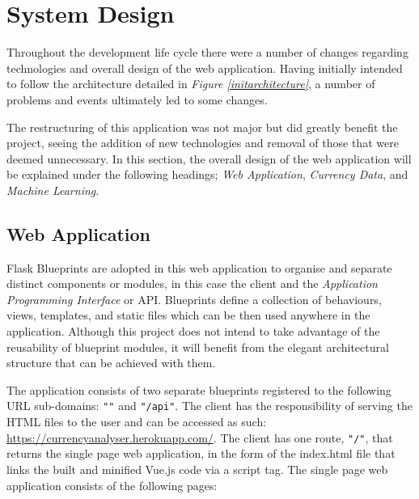 \section{System Design}\label{secdesign}

Throughout the development life cycle there were a number of changes regarding technologies and overall design of the web application. Having initially intended to follow the architecture detailed in \textit{Figure \ref{initarchitecture}}, a number of problems and events ultimately led to some changes.

The restructuring of this application was not major but did greatly benefit the project, seeing the addition of new technologies and removal of those that were deemed unnecessary. In this section, the overall design of the web application will be explained under the following headings; \textit{Web Application}, \textit{Currency Data}, and \textit{Machine Learning}.

\subsection{Web Application}

Flask Blueprints \cite{flaskblueprints} are adopted in this web application to organise and separate distinct components or modules, in this case the client and the \textit{Application Programming Interface} or API. Blueprints define a collection of behaviours, views, templates, and static files which can be then used anywhere in the application. Although this project does not intend to take advantage of the reusability of blueprint modules, it will benefit from the elegant architectural structure that can be achieved with them. 

The application consists of two separate blueprints registered to the following URL sub-domains: \texttt{""} and \texttt{"/api"}. The client has the responsibility of serving the HTML files to the user and can be accessed as such: \textcolor{NavyBlue}{\url{https://currencyanalyser.herokuapp.com/}}. The client has one route, \texttt{"/"}, that returns the single page web application, in the form of the index.html file that links the built and minified Vue.js code via a script tag. The single page web application consists of the following pages:

